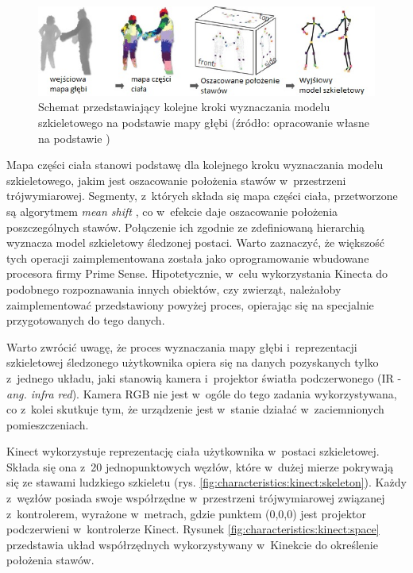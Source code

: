 \begin{savenotes}
	\begin{figure}[!htb]
		\centering	
		\includegraphics[width=\textwidth]{images/KinectRecognitionSteps.jpg}
		\caption[Schemat przedstawiający kolejne kroki wyznaczania modelu szkieletowego na podstawie mapy głębi]{Schemat przedstawiający kolejne kroki wyznaczania modelu szkieletowego na podstawie mapy głębi (źródło: opracowanie własne na podstawie \cite{MacCormick2011})}
		\label{fig:literature:kinect:classificationSteps}
	\end{figure}
\end{savenotes}
																									
Mapa części ciała stanowi podstawę dla kolejnego kroku wyznaczania modelu szkieletowego, jakim jest oszacowanie położenia stawów w~przestrzeni trójwymiarowej. Segmenty, z~których składa się mapa części ciała, przetworzone są algorytmem \emph{mean shift} \cite{Comaniciu2003}, co w~efekcie daje oszacowanie położenia poszczególnych stawów. Połączenie ich zgodnie ze zdefiniowaną hierarchią wyznacza model szkieletowy śledzonej postaci. Warto zaznaczyć, że większość tych operacji zaimplementowana została jako oprogramowanie wbudowane procesora firmy Prime Sense. Hipotetycznie, w~celu wykorzystania Kinecta do podobnego rozpoznawania innych obiektów, czy zwierząt, należałoby zaimplementować przedstawiony powyżej proces, opierając się na specjalnie przygotowanych do tego danych.

Warto zwrócić uwagę, że proces wyznaczania mapy głębi i~reprezentacji szkieletowej śledzonego użytkownika opiera się na danych pozyskanych tylko z~jednego układu, jaki stanowią kamera i~projektor światła podczerwonego (IR - \emph{ang. infra red}). Kamera RGB nie jest w~ogóle do tego zadania wykorzystywana, co z~kolei skutkuje tym, że urządzenie jest w~stanie działać w~zaciemnionych pomieszczeniach.
																									
Kinect wykorzystuje reprezentację ciała użytkownika w~postaci szkieletowej. Składa się ona z~20 jednopunktowych węzłów, które w~dużej mierze pokrywają się ze stawami ludzkiego szkieletu (rys. \ref{fig:characteristics:kinect:skeleton}). Każdy z~węzłów posiada swoje współrzędne w~przestrzeni trójwymiarowej związanej z~kontrolerem, wyrażone w~metrach, gdzie punktem (0,0,0) jest projektor podczerwieni w~kontrolerze Kinect. Rysunek \ref{fig:characteristics:kinect:space} przedstawia układ współrzędnych wykorzystywany w~Kinekcie do określenie położenia stawów. 
																									
